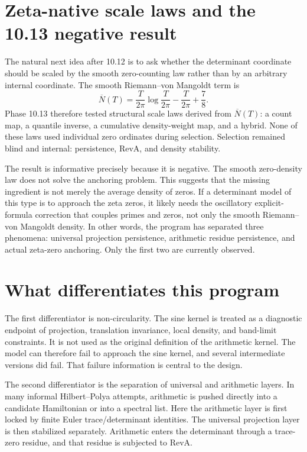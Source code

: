 \documentclass[11pt]{article}
\theoremstyle{definition}
\theoremstyle{plain}
\begin{document}
\section{Zeta-native scale laws and the 10.13 negative result}

The natural next idea after 10.12 is to ask whether the determinant coordinate should be scaled by the smooth zero-counting law rather than by an arbitrary internal coordinate.  The smooth Riemann--von Mangoldt term is
\begin{equation}
  \overline N(T)=\frac{T}{2\pi}\log\frac{T}{2\pi}-\frac{T}{2\pi}+\frac78.
\end{equation}
Phase 10.13 therefore tested structural scale laws derived from $\overline N(T)$: a count map, a quantile inverse, a cumulative density-weight map, and a hybrid.  None of these laws used individual zero ordinates during selection.  Selection remained blind and internal: persistence, RevA, and density stability.

The result is informative precisely because it is negative.  The smooth zero-density law does not solve the anchoring problem.  This suggests that the missing ingredient is not merely the average density of zeros.  If a determinant model of this type is to approach the zeta zeros, it likely needs the oscillatory explicit-formula correction that couples primes and zeros, not only the smooth Riemann--von Mangoldt density.  In other words, the program has separated three phenomena: universal projection persistence, arithmetic residue persistence, and actual zeta-zero anchoring.  Only the first two are currently observed.

\section{What differentiates this program}

The first differentiator is non-circularity.  The sine kernel is treated as a diagnostic endpoint of projection, translation invariance, local density, and band-limit constraints.  It is not used as the original definition of the arithmetic kernel.  The model can therefore fail to approach the sine kernel, and several intermediate versions did fail.  That failure information is central to the design.

The second differentiator is the separation of universal and arithmetic layers.  In many informal Hilbert--Polya attempts, arithmetic is pushed directly into a candidate Hamiltonian or into a spectral list.  Here the arithmetic layer is first locked by finite Euler trace/determinant identities.  The universal projection layer is then stabilized separately.  Arithmetic enters the determinant through a trace-zero residue, and that residue is subjected to RevA.
\end{document}
